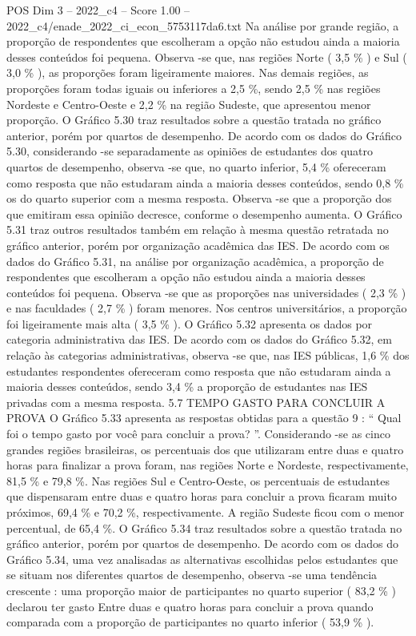 \begin{textsample}{POS Dim 3 – 2022\_c4 – Score 1.00 – 2022\_c4/enade\_2022\_ci\_econ\_5753117da6.txt}
Na análise por grande região, a proporção de respondentes que escolheram a opção não estudou ainda a maioria desses conteúdos foi pequena.
Observa -se que, nas regiões Norte ( 3,5 \% ) e Sul ( 3,0 \% ), as proporções foram ligeiramente maiores.
Nas demais regiões, as proporções foram todas iguais ou inferiores a 2,5 \%, sendo 2,5 \% nas regiões Nordeste e Centro-Oeste e 2,2 \% na região Sudeste, que apresentou menor proporção.
O Gráfico 5.30 traz resultados sobre a questão tratada no gráfico anterior, porém por quartos de desempenho.
De acordo com os dados do Gráfico 5.30, considerando -se separadamente as opiniões de estudantes dos quatro quartos de desempenho, observa -se que, no quarto inferior, 5,4 \% ofereceram como resposta que não estudaram ainda a maioria desses conteúdos, sendo 0,8 \% os do quarto superior com a mesma resposta.
Observa -se que a proporção dos que emitiram essa opinião decresce, conforme o desempenho aumenta.
O Gráfico 5.31 traz outros resultados também em relação à mesma questão retratada no gráfico anterior, porém por organização acadêmica das IES.
De acordo com os dados do Gráfico 5.31, na análise por organização acadêmica, a proporção de respondentes que escolheram a opção não estudou ainda a maioria desses conteúdos foi pequena.
Observa -se que as proporções nas universidades ( 2,3 \% ) e nas faculdades ( 2,7 \% ) foram menores.
Nos centros universitários, a proporção foi ligeiramente mais alta ( 3,5 \% ).
O Gráfico 5.32 apresenta os dados por categoria administrativa das IES.
De acordo com os dados do Gráfico 5.32, em relação às categorias administrativas, observa -se que, nas IES públicas, 1,6 \% dos estudantes respondentes ofereceram como resposta que não estudaram ainda a maioria desses conteúdos, sendo 3,4 \% a proporção de estudantes nas IES privadas com a mesma resposta. 5.7 TEMPO GASTO PARA CONCLUIR A PROVA O Gráfico 5.33 apresenta as respostas obtidas para a questão 9 : “ Qual foi o tempo gasto por você para concluir a prova? ”.
Considerando -se as cinco grandes regiões brasileiras, os percentuais dos que utilizaram entre duas e quatro horas para finalizar a prova foram, nas regiões Norte e Nordeste, respectivamente, 81,5 \% e 79,8 \%.
Nas regiões Sul e Centro-Oeste, os percentuais de estudantes que dispensaram entre duas e quatro horas para concluir a prova ficaram muito próximos, 69,4 \% e 70,2 \%, respectivamente.
A região Sudeste ficou com o menor percentual, de 65,4 \%.
O Gráfico 5.34 traz resultados sobre a questão tratada no gráfico anterior, porém por quartos de desempenho.
De acordo com os dados do Gráfico 5.34, uma vez analisadas as alternativas escolhidas pelos estudantes que se situam nos diferentes quartos de desempenho, observa -se uma tendência crescente : uma proporção maior de participantes no quarto superior ( 83,2 \% ) declarou ter gasto Entre duas e quatro horas para concluir a prova quando comparada com a proporção de participantes no quarto inferior ( 53,9 \% ).

\end{textsample}
